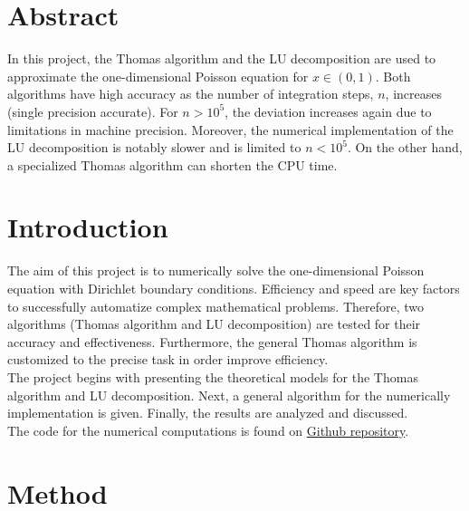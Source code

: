 \documentclass[%
oneside,                 %
final,                   %
10pt]{article}
\begin{document}





\newcommand{\exercisesection}[1]{\subsection*{#1}}






\thispagestyle{empty}


\section*{Abstract}
In this project, the Thomas algorithm and the LU decomposition are used to approximate the one-dimensional Poisson equation for $x\in(0,1)$.
Both algorithms have high accuracy as the number of integration steps, $n$, increases (single precision accurate).
For $n>10^5$, the deviation increases again due to limitations in machine precision.
Moreover, the numerical implementation of the LU decomposition is notably slower and is limited to $n<10^5$.
On the other hand, a specialized Thomas algorithm can shorten the CPU time.

\section*{Introduction}
The aim of this project is to numerically solve the one-dimensional Poisson equation with Dirichlet boundary conditions. 
Efficiency and speed are key factors to successfully automatize complex mathematical problems. 
Therefore, two algorithms (Thomas algorithm and LU decomposition) are tested for their accuracy and effectiveness. 
Furthermore, the general Thomas algorithm is customized to the precise task in order improve efficiency. \\
The project begins with presenting the theoretical models for the Thomas algorithm and LU decomposition. 
Next, a general algorithm for the numerically implementation is given.
Finally, the results are analyzed and discussed. \\
The code for the numerical computations is found on
\href{https://github.com/EliasTRuud/FYS3150/tree/master/Project1}{Github repository}.

\section*{Method}
\end{document}
